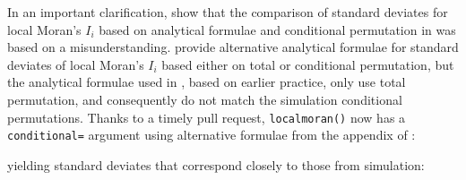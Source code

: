 \documentclass[]{book}
\newenvironment{Shaded}{\begin{snugshade}}{\end{snugshade}}
\newcommand{\CommentTok}[1]{\textcolor[rgb]{0.56,0.35,0.01}{\textit{#1}}}
\newcommand{\DataTypeTok}[1]{\textcolor[rgb]{0.13,0.29,0.53}{#1}}
\newcommand{\DecValTok}[1]{\textcolor[rgb]{0.00,0.00,0.81}{#1}}
\newcommand{\KeywordTok}[1]{\textcolor[rgb]{0.13,0.29,0.53}{\textbf{#1}}}
\newcommand{\NormalTok}[1]{#1}
\newcommand{\OperatorTok}[1]{\textcolor[rgb]{0.81,0.36,0.00}{\textbf{#1}}}
\newcommand{\OtherTok}[1]{\textcolor[rgb]{0.56,0.35,0.01}{#1}}
\newcommand{\StringTok}[1]{\textcolor[rgb]{0.31,0.60,0.02}{#1}}
\begin{document}
In an important clarification, \citet{sauer_oshan_rey_wolf_2021} show that the comparison of standard deviates for local Moran's \(I_i\) based on analytical formulae and conditional permutation in \citet{Bivand2018} was based on a misunderstanding. \citet{sokaletal:98} provide alternative analytical formulae for standard deviates of local Moran's \(I_i\) based either on total or conditional permutation, but the analytical formulae used in \citet{Bivand2018}, based on earlier practice, only use total permutation, and consequently do not match the simulation conditional permutations. Thanks to a timely pull request, \texttt{localmoran()} now has a \texttt{conditional=} argument using alternative formulae from the appendix of \citet{sokaletal:98}:

\begin{Shaded}
\end{Shaded}

yielding standard deviates that correspond closely to those from simulation:

\begin{Shaded}
\end{Shaded}
\end{document}

